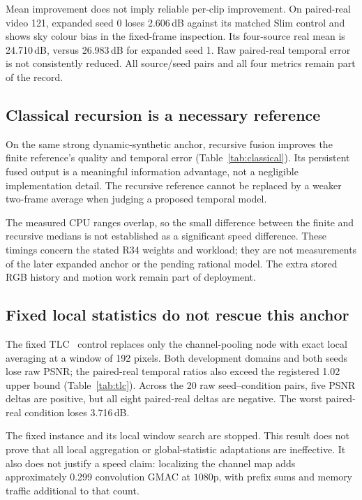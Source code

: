 Mean improvement does not imply reliable per-clip improvement. On paired-real
video 121, expanded seed 0 loses 2.606\,dB against its matched Slim control
and shows sky colour bias in the fixed-frame inspection. Its four-source
real mean is 24.710\,dB, versus 26.983\,dB for expanded seed 1. Raw
paired-real temporal error is not consistently reduced. All source/seed
pairs and all four metrics remain part of the record.

\subsection{Classical recursion is a necessary reference}

On the same strong dynamic-synthetic anchor, recursive fusion improves
the finite reference's quality and temporal error
(Table~\ref{tab:classical}). Its persistent fused output is a meaningful
information advantage, not a negligible implementation detail. The
recursive reference cannot be replaced by a weaker two-frame average
when judging a proposed temporal model.

The measured CPU ranges overlap, so the small difference between the finite
and recursive medians is not established as a significant speed difference.
These timings concern the stated R34 weights and workload; they are not
measurements of the later expanded anchor or the pending rational model.
The extra stored RGB history and motion work remain part of deployment.

\subsection{Fixed local statistics do not rescue this anchor}

The fixed TLC~\cite{tlc} control replaces only the channel-pooling node
with exact local averaging at a window of 192 pixels. Both development
domains and both seeds lose raw PSNR; the paired-real temporal ratios also
exceed the registered 1.02 upper bound (Table~\ref{tab:tlc}).
Across the 20 raw seed--condition pairs, five PSNR deltas are positive,
but all eight paired-real deltas are negative. The worst paired-real
condition loses 3.716\,dB.

The fixed instance and its local window search are stopped. This result
does not prove that all local aggregation or global-statistic adaptations
are ineffective. It also does not justify a speed claim: localizing the
channel map adds approximately 0.299 convolution GMAC at $1080\mathrm p$,
with prefix sums and memory traffic additional to that count.

